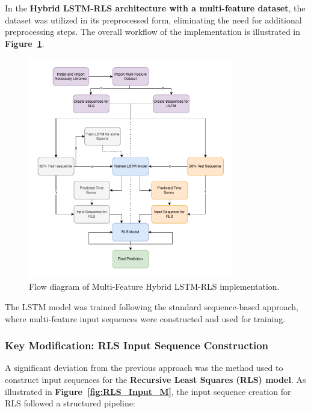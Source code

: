 In the \textbf{Hybrid LSTM-RLS architecture with a multi-feature dataset}, the dataset was utilized in its preprocessed form, eliminating the need for additional preprocessing steps. The overall workflow of the implementation is illustrated in \textbf{Figure~\ref{fig:HybridLSTM_RLS_M}}.

\begin{figure}[h!]
    \centering
    \includegraphics[width=0.8\textwidth]{Images/HybridLSTM_RLS_M.pdf}
    \caption{Flow diagram of Multi-Feature Hybrid LSTM-RLS implementation.}
    \label{fig:HybridLSTM_RLS_M}
\end{figure}

The LSTM model was trained following the standard sequence-based approach, where multi-feature input sequences were constructed and used for training.

\subsubsection{Key Modification: RLS Input Sequence Construction}

A significant deviation from the previous approach was the method used to construct input sequences for the \textbf{Recursive Least Squares (RLS) model}. As illustrated in \textbf{Figure~\ref{fig:RLS_Input_M}}, the input sequence creation for RLS followed a structured pipeline:

